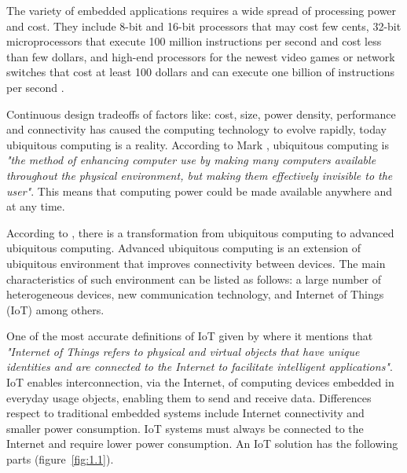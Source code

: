The variety of embedded applications requires a wide spread of processing power
and cost. They include 8-bit and 16-bit processors that may cost few cents,
32-bit microprocessors that execute 100 million instructions per second and
cost less than few dollars, and high-end processors for the newest video games
or network switches that cost at least 100 dollars and can execute one billion
of instructions per second \cite{Hennessy}.

Continuous design tradeoffs of factors like: cost, size, power density,
performance and connectivity has caused the computing technology to evolve
rapidly, today ubiquitous computing is a reality. According to Mark
\cite{Mark}, ubiquitous computing is \textit{"the method of enhancing computer
use by making many computers available throughout the physical environment, but
making them effectively invisible to the user"}. This means that computing
power could be made available anywhere and at any time. 


According to \cite{Nur}, there is a transformation from ubiquitous computing to
advanced ubiquitous computing. Advanced ubiquitous computing is an extension of
ubiquitous environment that improves connectivity between devices. The main
characteristics of such environment can be listed as follows: a large number of
heterogeneous devices, new communication technology, and Internet of Things
(IoT) among others.

One of the most accurate definitions of IoT given by \cite{Bahga} where it
mentions that \textit{"Internet of Things refers to physical and virtual
objects that have unique identities and are connected to the Internet to
facilitate intelligent applications"}. IoT enables interconnection, via the
Internet, of computing devices embedded in everyday usage objects, enabling
them to send and receive data. Differences respect to traditional embedded
systems include Internet connectivity and smaller power consumption. IoT
systems must always be connected to the Internet and require lower power
consumption. An IoT solution has the following parts (figure~\ref{fig:1.1}).


